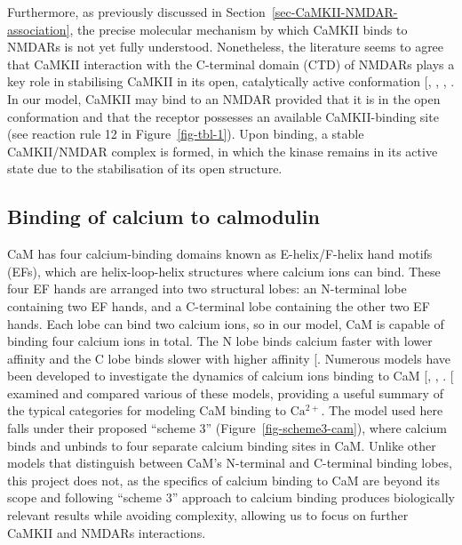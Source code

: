 \documentclass[
  11pt,
  letterpaper,
]{scrreprt}
\begin{document}
Furthermore, as previously discussed in
Section~\ref{sec-CaMKII-NMDAR-association}, the precise molecular
mechanism by which CaMKII binds to NMDARs is not yet fully understood.
Nonetheless, the literature seems to agree that CaMKII interaction with
the C-terminal domain (CTD) of NMDARs plays a key role in stabilising
CaMKII in its open, catalytically active conformation
{[},
,
,
\citeproc{ref-bayer2006Transitionb}{214}{]}. In our model, CaMKII may
bind to an NMDAR provided that it is in the open conformation and that
the receptor possesses an available CaMKII-binding site (see reaction
rule 12 in Figure~\ref{fig-tbl-1}). Upon binding, a stable CaMKII/NMDAR
complex is formed, in which the kinase remains in its active state due
to the stabilisation of its open structure.

\subsection{Binding of calcium to calmodulin}\label{sec-binding-ca-cam}

CaM has four calcium-binding domains known as E-helix/F-helix hand
motifs (EFs), which are helix-loop-helix structures where calcium ions
can bind. These four EF hands are arranged into two structural lobes: an
N-terminal lobe containing two EF hands, and a C-terminal lobe
containing the other two EF hands. Each lobe can bind two calcium ions,
so in our model, CaM is capable of binding four calcium ions in total.
The N lobe binds calcium faster with lower affinity and the C lobe binds
slower with higher affinity
{[}\citeproc{ref-kawasaki2017Conformational}{453}{]}. Numerous models
have been developed to investigate the dynamics of calcium ions binding
to CaM {[},
,
\citeproc{ref-gonzalez-andrade2016Insights}{455}{]}.
{[}\citeproc{ref-linkevicius2025Fitting}{456}{]} examined and compared
various of these models, providing a useful summary of the typical
categories for modeling CaM binding to \(\mathrm{Ca^{2+}}\). The model
used here falls under their proposed ``scheme 3''
(Figure~\ref{fig-scheme3-cam}), where calcium binds and unbinds to four
separate calcium binding sites in CaM. Unlike other models that
distinguish between CaM's N-terminal and C-terminal binding lobes, this
project does not, as the specifics of calcium binding to CaM are beyond
its scope and following ``scheme 3'' approach to calcium binding
produces biologically relevant results while avoiding complexity,
allowing us to focus on further CaMKII and NMDARs interactions.
\end{document}
